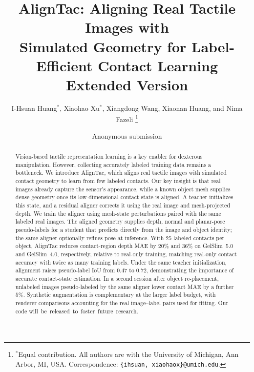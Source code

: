 \documentclass[letterpaper,10pt,conference]{ieeeconf}
\title{\LARGE\bf AlignTac: Aligning Real Tactile Images
with\\ Simulated Geometry for Label-Efficient Contact Learning\\{\large Extended Version}}
\author{I-Hsuan Huang$^{*}$, Xiaohao Xu$^{*}$, Xiangdong Wang, Xiaonan Huang, and Nima Fazeli%
\thanks{$^{*}$Equal contribution. All authors are with the University of Michigan, Ann Arbor, MI, USA.
Correspondence: \texttt{\{ihsuan, xiaohaox\}@umich.edu}.}%
}
\author{Anonymous submission}
\DeclareRobustCommand{\FinalLine}[1]{\mbox{#1}}%
\begin{document}
\maketitle
\thispagestyle{empty}
\pagestyle{empty}\raggedbottom

\begin{abstract}
Vision-based tactile representation learning is a key enabler for dexterous manipulation. However, collecting accurately labeled training data remains a bottleneck. We introduce AlignTac, which aligns real tactile images with simulated contact geometry to learn from few labeled contacts. Our key insight is that real images already capture the sensor's appearance, while a known object mesh supplies dense geometry once its low-dimensional contact state is aligned. A teacher initializes this state, and a residual aligner corrects it using the real image and mesh-projected depth. We train the aligner using mesh-state perturbations paired with the same labeled real images. The aligned geometry supplies depth, normal and planar-pose pseudo-labels for a student that predicts directly from the image and object identity; the same aligner optionally refines pose at inference. With 25 labeled contacts per object, AlignTac reduces contact-region depth MAE by $20\%$ and $36\%$ on GelSlim~5.0 and GelSlim~4.0, respectively, relative to real-only training, matching real-only contact accuracy with twice as many training labels. Under the same teacher initialization, alignment raises pseudo-label IoU from $0.47$ to $0.72$, demonstrating the importance of accurate contact-state estimation. In a second session after object re-placement, unlabeled images pseudo-labeled by the same aligner lower contact MAE by a further $5\%$. Synthetic augmentation is complementary at the larger label budget, with renderer comparisons accounting for the real image--label pairs used for fitting. Our code \FinalLine{will be released to foster future research.}
\end{abstract}










\end{document}
